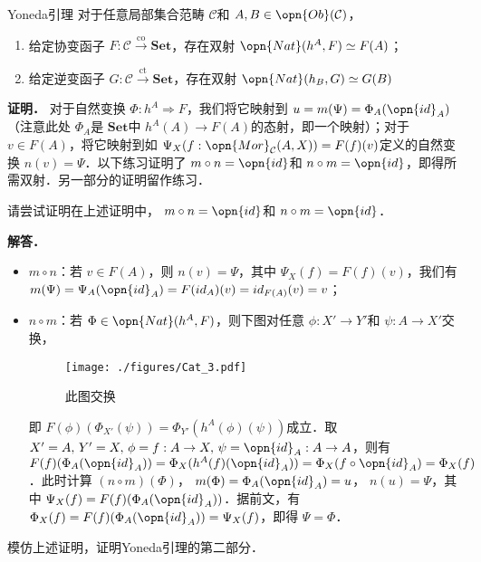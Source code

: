 \begin{theorem}{Yoneda引理}
对于任意局部集合范畴 $\mathcal{C}$和 $A,B\in\opn{Ob}(\mathcal{C})$，
\begin{enumerate}
\item 给定协变函子 $F:\mathcal{C}\overset{\text{co}}{\to}\mathbf{Set}$，存在双射 $\opn{Nat}(h^A,F)\simeq F(A)$；
\item 给定逆变函子 $G:\mathcal{C}\overset{\text{ct}}{\to}\mathbf{Set}$，存在双射 $\opn{Nat}(h_B,G)\simeq G(B)$
\end{enumerate}
\end{theorem}
\textbf{证明．}
对于自然变换 $\Phi:h^A\Rightarrow F$，我们将它映射到 $u=m(\Psi)=\Phi_A(\opn{id}_A)$（注意此处 $\Phi_A$是 $\mathbf{Set}$中 $h^A(A)\to F(A)$的态射，即一个映射）；对于 $v\in F(A)$，将它映射到如 $\Psi_X(f:\opn{Mor}_\mathcal{C}(A,X))=F(f)(v)$定义的自然变换 $n(v)=\Psi$．以下练习证明了 $m\circ n=\opn{id}$和 $n\circ m=\opn{id}$，即得所需双射．另一部分的证明留作练习．
\begin{exercise}{}
请尝试证明在上述证明中， $m\circ n=\opn{id}$和 $n\circ m=\opn{id}$．
\end{exercise}
\textbf{解答．}
\begin{itemize}
\item $m\circ n$：若 $v\in F(A)$，则 $n(v)=\Psi$，其中 $\Psi_X(f)=F(f)(v)$，我们有 $m(\Psi)=\Psi_A(\opn{id}_A)=F(id_A)(v)=id_{F(A)}(v)=v$；
\item $n\circ m$：若 $\Phi\in\opn{Nat}(h^A,F)$，则下图对任意 $\phi:X'\to Y'$和 $\psi:A\to X'$交换，
\begin{figure}[ht]
\centering
\texttt{[image: ./figures/Cat\_3.pdf]}
\caption{此图交换} \label{Cat_fig3}
\end{figure}
即 $F(\phi)(\Phi_{X'}(\psi))=\Phi_{Y'}(h^A(\phi)(\psi))$成立．取 $X'=A,\,Y'=X,\,\phi=f:A\to X,\,\psi=\opn{id}_A:A\to A$，则有 $F(f)(\Phi_A(\opn{id}_A))=\Phi_X(h^A(f)(\opn{id}_A))=\Phi_X(f\circ\opn{id}_A)=\Phi_X(f)$．此时计算 $(n\circ m)(\Phi)$， $m(\Phi)=\Phi_A(\opn{id}_A)=u$， $n(u)=\Psi$，其中 $\Psi_X(f)=F(f)(\Phi_A(\opn{id}_A))$．据前文，有 $\Phi_X(f)=F(f)(\Phi_A(\opn{id}_A))=\Psi_X(f)$，即得 $\Psi=\Phi$．
\end{itemize}
\begin{exercise}{}
模仿上述证明，证明Yoneda引理的第二部分．
\end{exercise}